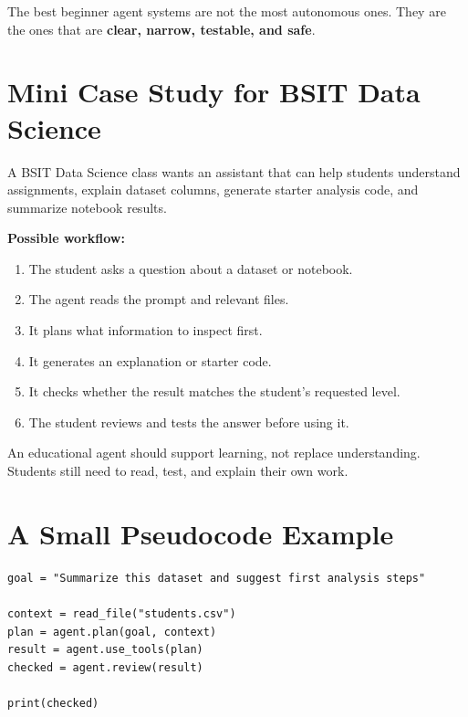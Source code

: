 \documentclass[11pt,a4paper]{article}
\begin{document}
\begin{conceptbox}
The best beginner agent systems are not the most autonomous ones. They are the ones that are \textbf{clear, narrow, testable, and safe}.
\end{conceptbox}

\section{Mini Case Study for BSIT Data Science}

\begin{definitionbox}[Scenario]
A BSIT Data Science class wants an assistant that can help students understand assignments, explain dataset columns, generate starter analysis code, and summarize notebook results.
\end{definitionbox}

\textbf{Possible workflow:}
\begin{enumerate}[leftmargin=*]
  \item The student asks a question about a dataset or notebook.
  \item The agent reads the prompt and relevant files.
  \item It plans what information to inspect first.
  \item It generates an explanation or starter code.
  \item It checks whether the result matches the student's requested level.
  \item The student reviews and tests the answer before using it.
\end{enumerate}

\begin{alertbox}
An educational agent should support learning, not replace understanding. Students still need to read, test, and explain their own work.
\end{alertbox}

\section{A Small Pseudocode Example}

\begin{lstlisting}
goal = "Summarize this dataset and suggest first analysis steps"

context = read_file("students.csv")
plan = agent.plan(goal, context)
result = agent.use_tools(plan)
checked = agent.review(result)

print(checked)
\end{lstlisting}
\end{document}
